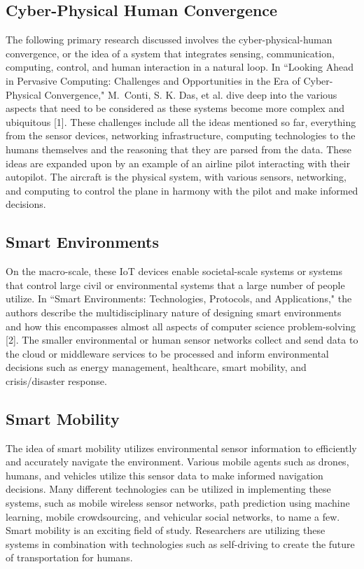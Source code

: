 \documentclass[journal,onecolumn]{IEEEtran}
\begin{document}
\subsection{Cyber-Physical Human Convergence}

The following primary research discussed involves the cyber-physical-human convergence, or the idea of a system that integrates sensing, communication, computing, control, and human interaction in a natural loop. 
In ``Looking Ahead in Pervasive Computing: Challenges and Opportunities in the Era of Cyber-Physical Convergence," M.~Conti, S. K. Das, et al. dive deep into the various aspects that need to be considered as these systems become more complex and ubiquitous [1]. 
These challenges include all the ideas mentioned so far, everything from the sensor devices, networking infrastructure, computing technologies to the humans themselves and the reasoning that they are parsed from the data. 
These ideas are expanded upon by an example of an airline pilot interacting with their autopilot. 
The aircraft is the physical system, with various sensors, networking, and computing to control the plane in harmony with the pilot and make informed decisions. 

\subsection{Smart Environments}

On the macro-scale, these IoT devices enable societal-scale systems or systems that control large civil or environmental systems that a large number of people utilize. 
In ``Smart Environments: Technologies, Protocols, and Applications," the authors describe the multidisciplinary nature of designing smart environments and how this encompasses almost all aspects of computer science problem-solving [2].
The smaller environmental or human sensor networks collect and send data to the cloud or middleware services to be processed and inform environmental decisions such as energy management, healthcare, smart mobility, and crisis/disaster response. 

\subsection{Smart Mobility}

The idea of smart mobility utilizes environmental sensor information to efficiently and accurately navigate the environment. 
Various mobile agents such as drones, humans, and vehicles utilize this sensor data to make informed navigation decisions. 
Many different technologies can be utilized in implementing these systems, such as mobile wireless sensor networks, path prediction using machine learning, mobile crowdsourcing, and vehicular social networks, to name a few. 
Smart mobility is an exciting field of study. Researchers are utilizing these systems in combination with technologies such as self-driving to create the future of transportation for humans. 
\end{document}
